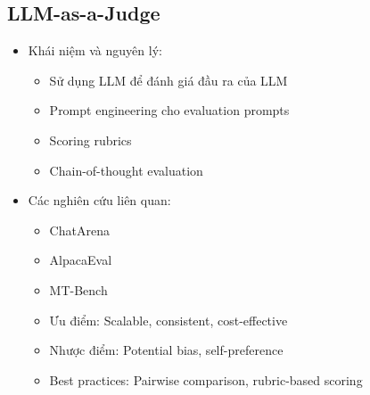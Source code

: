 \subsection{LLM-as-a-Judge}
\begin{itemize}
    \item Khái niệm và nguyên lý:
    \begin{itemize}
        \item Sử dụng LLM để đánh giá đầu ra của LLM
    \end{itemize}
    \begin{itemize}
        \item Prompt engineering cho evaluation prompts
    \end{itemize}
    \begin{itemize}
        \item Scoring rubrics
    \end{itemize}
    \begin{itemize}
        \item Chain-of-thought evaluation
    \end{itemize}
    \item Các nghiên cứu liên quan:
    \begin{itemize}
        \item ChatArena
        \item AlpacaEval
        \item MT-Bench
    \end{itemize}
    \begin{itemize}
        \item Ưu điểm: Scalable, consistent, cost-effective
    \end{itemize}
    \begin{itemize}
        \item Nhược điểm: Potential bias, self-preference
    \end{itemize}
    \begin{itemize}
        \item Best practices: Pairwise comparison, rubric-based scoring
    \end{itemize}
\end{itemize}
